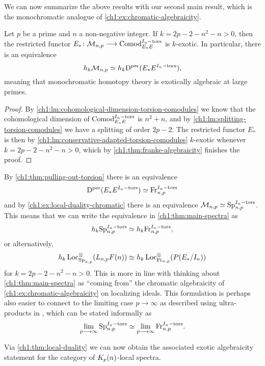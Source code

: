 We can now summarize the above results with our second main result, which is the monochromatic analogue of \cref{ch1:ex:chromatic-algebraicity}. 

\begin{theorem}
    \label{ch1:thm:main-spectra}
    Let $p$ be a prime and $n$ a non-negative integer. If $k=2p-2-n^2-n>0$, then the restricted functor $E_*\colon \mathcal{M}_{n,p}\longrightarrow \mathrm{Comod}_{E_*E}^{I_n-\mathrm{tors}}$ is $k$-exotic. In particular, there is an equivalence 
    \[h_k \mathcal{M}_{n,p} \simeq h_k\mathrm{D}^{\mathrm{per}}(E_*E^{I_n-\mathrm{tors}}),\]
    meaning that monochromatic homotopy theory is exotically algebraic at large primes. 
\end{theorem}
\begin{proof}
    By \cref{ch1:lm:cohomological-dimension-torsion-comodules} we know that the cohomological dimension of $\mathrm{Comod}_{E_*E}^{I_n-\mathrm{tors}}$ is $n^2+n$, and by \cref{ch1:lm:splitting-torsion-comodules} we have a splitting of order $2p-2$. The restricted functor $E_*$ is then by \cref{ch1:lm:conservative-adapted-torsion-comodules} $k$-exotic whenever $k=2p-2-n^2-n>0$, which by \cref{ch1:thm:franke-algebraicity} finishes the proof. 
\end{proof}

\begin{remark}
    \label{ch1:rm:monochromatic-corresponds-to-torsion}
    By \cref{ch1:thm:pulling-out-torsion} there is an equivalence 
    \[\mathrm{D}^{\mathrm{per}}(E_*E^{I_n-\mathrm{tors}})\simeq \mathrm{Fr}_{n,p}^{I_n-\mathrm{tors}}\] 
    and by \cref{ch1:ex:local-duality-chromatic} there is an equivalence $\mathcal{M}_{n,p}\simeq \mathrm{Sp}_{n,p}^{I_n-\mathrm{tors}}$. This means that we can write the equivalence in \cref{ch1:thm:main-spectra} as 
    \[h_k\mathrm{Sp}_{n,p}^{I_n-\mathrm{tors}}\simeq h_k\mathrm{Fr}_{n,p}^{I_n-\mathrm{tors}},\]
    or alternatively, 
    \[h_k \operatorname{Loc}^\otimes_{\mathrm{Sp}_{n,p}}(L_{n,p} F(n)) \simeq h_k \operatorname{Loc}^\otimes_{\mathrm{Fr}_{n,p}}(P(E_*/I_n))\]
    for $k=2p-2-n^2-n>0$. This is more in line with thinking about \cref{ch1:thm:main-spectra} as ``coming from'' the chromatic algebraicity of \cref{ch1:ex:chromatic-algebraicity} on localizing ideals. This formulation is perhaps also easier to connect to the limiting case $p\to \infty$ as described using ultra-products in \cite{barthel-schlank-stapleton_2021}, which can be stated informally as 
    \[\lim_{p\longrightarrow \infty} \mathrm{Sp}_{n,p}^{I_n-\mathrm{tors}}\simeq \lim_{p\longrightarrow \infty} \mathrm{Fr}_{n,p}^{I_n-\mathrm{tors}}.\]
\end{remark}


Via \cref{ch1:thm:local-duality} we can now obtain the associated exotic algebraicity statement for the category of ${K_p(n)}$-local spectra.

